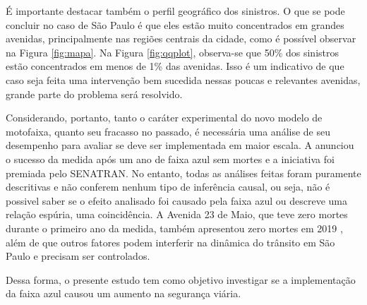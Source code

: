 É importante destacar também o perfil geográfico dos sinistros. O que se pode concluir no caso de São Paulo é que eles estão muito concentrados em grandes avenidas, principalmente nas regiões centrais da cidade, como é possível observar na Figura \ref{fig:mapa}. Na Figura \ref{fig:qqplot}, observa-se que 50\% dos sinistros estão concentrados em menos de 1\% das avenidas. Isso é um indicativo de que caso seja feita uma intervenção bem sucedida nessas poucas e relevantes avenidas, grande parte do problema será resolvido.

Considerando, portanto, tanto o caráter experimental do novo modelo de motofaixa, quanto seu fracasso no passado, é necessária uma análise de seu desempenho para avaliar se deve ser implementada em maior escala. A \textcite{premioSENATRAN} anunciou o sucesso da medida após um ano de faixa azul sem mortes e a iniciativa foi premiada pelo SENATRAN. No entanto, todas as análises feitas foram puramente descritivas e não conferem nenhum tipo de inferência causal, ou seja, não é possivel saber se o efeito analisado foi causado pela faixa azul ou descreve uma relação espúria, uma coincidência. A Avenida 23 de Maio, que teve zero mortes durante o primeiro ano da medida, também apresentou zero mortes em 2019 \cite{relatorioCET}, além de que outros fatores podem interferir na dinâmica do trânsito em São Paulo e precisam ser controlados.

Dessa forma, o presente estudo tem como objetivo investigar se a implementação da faixa azul causou um aumento na segurança viária.

